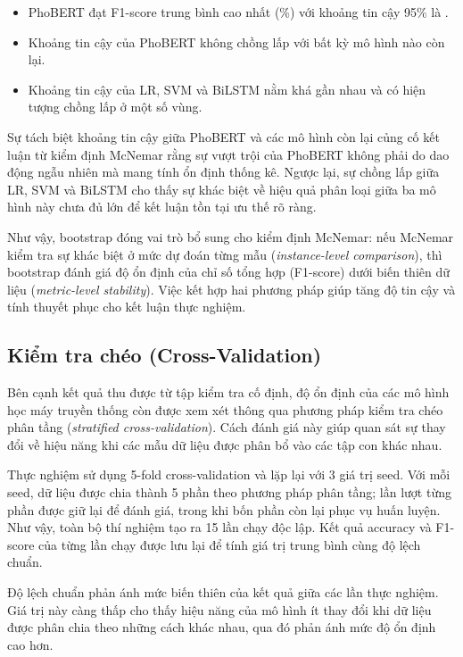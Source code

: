 \begin{itemize}
    \item PhoBERT đạt F1-score trung bình cao nhất (\phobertfone\%) với khoảng tin cậy 95\% là {\phobertfonecI{}}.
    \item Khoảng tin cậy của PhoBERT không chồng lấp với bất kỳ mô hình nào còn lại.
    \item Khoảng tin cậy của LR, SVM và BiLSTM nằm khá gần nhau và có hiện tượng chồng lấp ở một số vùng.
\end{itemize}

Sự tách biệt khoảng tin cậy giữa PhoBERT và các mô hình còn lại củng cố kết luận từ kiểm định McNemar rằng sự vượt trội của PhoBERT không phải do dao động ngẫu nhiên mà mang tính ổn định thống kê. Ngược lại, sự chồng lấp giữa LR, SVM và BiLSTM cho thấy sự khác biệt về hiệu quả phân loại giữa ba mô hình này chưa đủ lớn để kết luận tồn tại ưu thế rõ ràng.

Như vậy, bootstrap đóng vai trò bổ sung cho kiểm định McNemar: nếu McNemar kiểm tra sự khác biệt ở mức dự đoán từng mẫu (\textit{instance-level comparison}), thì bootstrap đánh giá độ ổn định của chỉ số tổng hợp (F1-score) dưới biến thiên dữ liệu (\textit{metric-level stability}). Việc kết hợp hai phương pháp giúp tăng độ tin cậy và tính thuyết phục cho kết luận thực nghiệm.

\subsection{Kiểm tra chéo (Cross-Validation)}

Bên cạnh kết quả thu được từ tập kiểm tra cố định, độ ổn định của các mô hình học máy truyền thống còn được xem xét thông qua phương pháp kiểm tra chéo phân tầng (\textit{stratified cross-validation}). Cách đánh giá này giúp quan sát sự thay đổi về hiệu năng khi các mẫu dữ liệu được phân bổ vào các tập con khác nhau.

Thực nghiệm sử dụng 5-fold cross-validation và lặp lại với 3 giá trị seed. Với mỗi seed, dữ liệu được chia thành 5 phần theo phương pháp phân tầng; lần lượt từng phần được giữ lại để đánh giá, trong khi bốn phần còn lại phục vụ huấn luyện. Như vậy, toàn bộ thí nghiệm tạo ra 15 lần chạy độc lập. Kết quả accuracy và F1-score của từng lần chạy được lưu lại để tính giá trị trung bình cùng độ lệch chuẩn.

Độ lệch chuẩn phản ánh mức biến thiên của kết quả giữa các lần thực nghiệm. Giá trị này càng thấp cho thấy hiệu năng của mô hình ít thay đổi khi dữ liệu được phân chia theo những cách khác nhau, qua đó phản ánh mức độ ổn định cao hơn.

